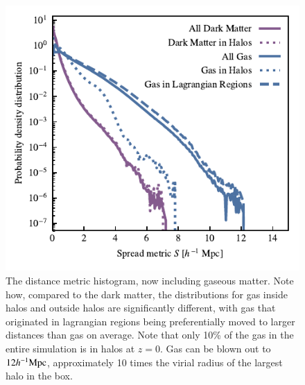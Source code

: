 \begin{figure}
    \centering
    \includegraphics{figures/s50j7kAHF/distance_plot_split_by_component+AHF.pdf}
    \vspace{-0.5cm}
    \caption{The distance metric histogram, now including gaseous matter.
    Note how, compared to the dark matter, the distributions for gas inside
    halos and outside halos are significantly different, with gas that
    originated in lagrangian regions being preferentially moved to larger
    distances than gas on average. Note that only 10\% of the gas in the
    entire simulation is in halos at $z=0$. Gas can be blown out to
    $12h^{-1}{\rm Mpc}{}$, approximately 10 times the virial radius of the largest halo
    in the box.}
    \vspace{-0.5cm}
    \label{fig:distbaryon}
\end{figure}

